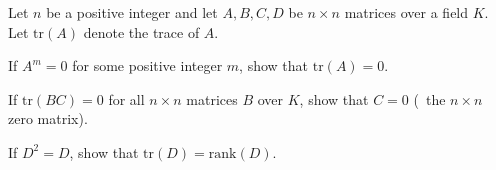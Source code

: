 Let $n$ be a positive integer and let $A,B,C,D$ be $n\times n$
matrices over a field $K$. Let $\mathrm{tr}(A)$ denote the trace of
$A$.
\begin{alist}
\item If $A^m=0$ for some positive integer $m$, show that
$\mathrm{tr}(A)=0$.
\item If $\mathrm{tr}(BC)=0$ for all $n\times n$ matrices $B$ over
$K$, show that $C=0$ (\ie\ the $n\times n$ zero matrix).
\item If $D^2=D$, show that $\mathrm{tr}(D)=\mathrm{rank}(D)$.
\end{alist}
